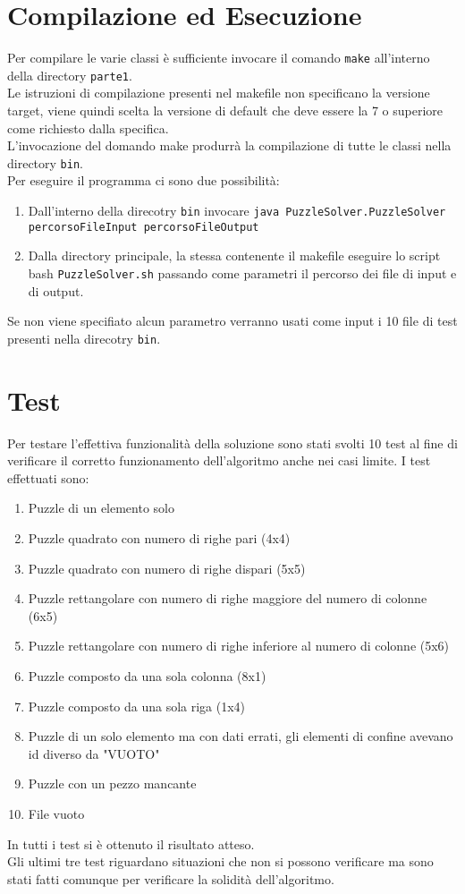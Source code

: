 \documentclass[a4paper, 11pt]{article}
\begin{document}
\section{Compilazione ed Esecuzione}
Per compilare le varie classi è sufficiente invocare il comando \texttt{make} all'interno della directory \texttt{parte1}.\\
Le istruzioni di compilazione presenti nel makefile non specificano la versione target, viene quindi scelta la versione di default che deve essere la 7 o superiore come richiesto dalla specifica.\\
L'invocazione del domando make produrrà la compilazione di tutte le classi nella directory \texttt{bin}.\\
Per eseguire il programma ci sono due possibilità:
\begin{enumerate}
\item Dall'interno della direcotry \texttt{bin} invocare \texttt{java PuzzleSolver.PuzzleSolver percorsoFileInput percorsoFileOutput}
\item Dalla directory principale, la stessa contenente il makefile eseguire lo script bash \texttt{PuzzleSolver.sh} passando come parametri il percorso dei file di input e di output.
\end{enumerate}
Se non viene specifiato alcun parametro verranno usati come input i 10 file di test presenti nella direcotry \texttt{bin}.
\section{Test}

Per testare l'effettiva funzionalità della soluzione sono stati svolti 10 test al fine di verificare il corretto funzionamento dell'algoritmo anche nei casi limite.
I test effettuati sono:
\begin{enumerate}
\item Puzzle di un elemento solo
\item Puzzle quadrato con numero di righe pari (4x4)
\item Puzzle quadrato con numero di righe dispari (5x5)
\item Puzzle rettangolare con numero di righe maggiore del numero di colonne (6x5)
\item Puzzle rettangolare con numero di righe inferiore al numero di colonne (5x6)
\item Puzzle composto da una sola colonna (8x1)
\item Puzzle composto da una sola riga (1x4)
\item Puzzle di un solo elemento ma con dati errati, gli elementi di confine avevano id diverso da "VUOTO"
\item Puzzle con un pezzo mancante
\item File vuoto
\end{enumerate}
In tutti i test si è ottenuto il risultato atteso.
\\
Gli ultimi tre test riguardano situazioni che non si possono verificare ma sono stati fatti comunque per verificare la solidità dell'algoritmo.
\end{document}
